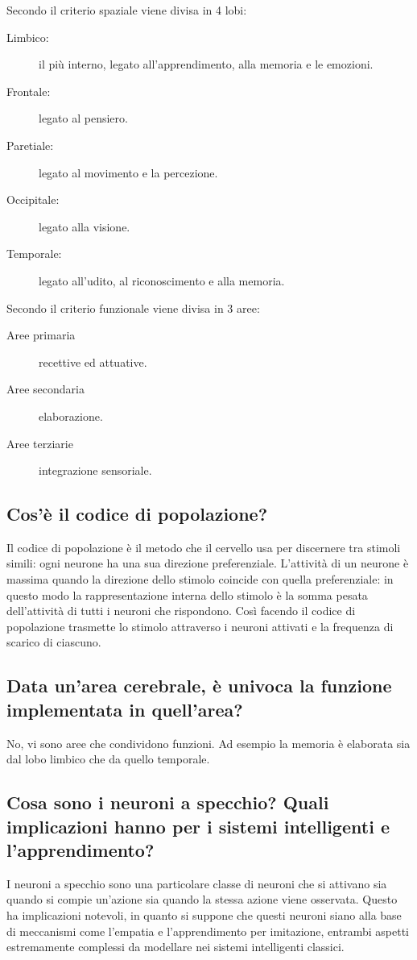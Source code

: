 \documentclass[\main/main.tex]{subfiles}
\begin{document}
Secondo il criterio spaziale viene divisa in 4 lobi:
\begin{description}
  \item[Limbico:] il più interno, legato all'apprendimento, alla memoria e le emozioni.
  \item[Frontale:] legato al pensiero.
  \item[Paretiale:] legato al movimento e la percezione.
  \item[Occipitale:] legato alla visione.
  \item[Temporale:] legato all'udito, al riconoscimento e alla memoria.
\end{description}

Secondo il criterio funzionale viene divisa in 3 aree:
\begin{description}
  \item[Aree primaria] recettive ed attuative.
  \item[Aree secondaria] elaborazione.
  \item[Aree terziarie] integrazione sensoriale.
\end{description}

\subsection{Cos'è il codice di popolazione?}
Il codice di popolazione è il metodo che il cervello usa per discernere tra stimoli simili: ogni neurone ha una sua direzione preferenziale. L'attività di un neurone è massima quando la direzione dello stimolo coincide con quella preferenziale: in questo modo la rappresentazione interna dello stimolo è la somma pesata dell'attività di tutti i neuroni che rispondono. Così facendo il codice di popolazione trasmette lo stimolo attraverso i neuroni attivati e la frequenza di scarico di ciascuno.

\subsection{Data un'area cerebrale, è univoca la funzione implementata in quell'area?}
No, vi sono aree che condividono funzioni. Ad esempio la memoria è elaborata sia dal lobo limbico che da quello temporale.

\subsection{Cosa sono i neuroni a specchio? Quali implicazioni hanno per i sistemi intelligenti e l'apprendimento?}
I neuroni a specchio sono una particolare classe di neuroni che si attivano sia quando si compie un'azione sia quando la stessa azione viene osservata. Questo ha implicazioni notevoli, in quanto si suppone che questi neuroni siano alla base di meccanismi come l'empatia e l'apprendimento per imitazione, entrambi aspetti estremamente complessi da modellare nei sistemi intelligenti classici.
\end{document}
